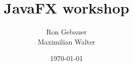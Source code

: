\title{JavaFX workshop}
\author[Ron Gebauer \& Maximlian Walter]{Ron Gebauer \\Maximilian Walter}
\date{\today}

\begin{frame}
	\titlepage
\end{frame}